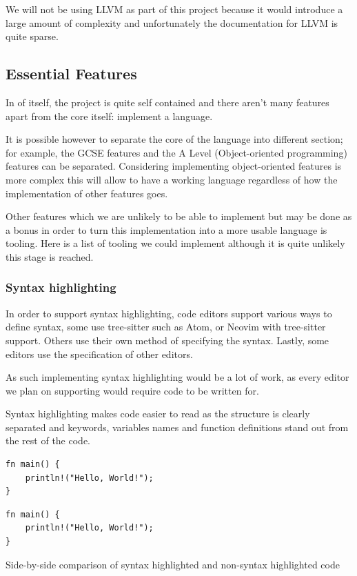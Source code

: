 \documentclass{article}
\begin{document}
We will not be using LLVM as part of this project because it would introduce a
large amount of complexity and unfortunately the documentation for LLVM is
quite sparse.

\subsection{Essential Features}

In of itself, the project is quite self contained and there aren't many
features apart from the core itself: implement a language.

It is possible however to separate the core of the language into different
section; for example, the GCSE features and the A Level (Object-oriented
programming) features can be separated. Considering implementing
object-oriented features is more complex this will allow to have a working
language regardless of how the implementation of other features goes.

Other features which we are unlikely to be able to implement but may be done as
a bonus in order to turn this implementation into a more usable language is
tooling. Here is a list of tooling we could implement although it is quite
unlikely this stage is reached.

\subsubsection{Syntax highlighting}

In order to support syntax highlighting, code editors support various ways to
define syntax, some use tree-sitter such as Atom, or Neovim with tree-sitter
support. Others use their own method of specifying the syntax. Lastly, some
editors use the specification of other editors.

As such implementing syntax highlighting would be a lot of work, as every
editor we plan on supporting would require code to be written for.

Syntax highlighting makes code easier to read as the structure is clearly
separated and keywords, variables names and function definitions stand out from
the rest of the code.

\begin{listing}
	\centering
	\begin{minipage}{.5\textwidth}
		\centering
		\begin{verbatim}
fn main() {
    println!("Hello, World!");
}
		\end{verbatim}
	\end{minipage}%
	\begin{minipage}{.5\textwidth}
		\centering
		\begin{verbatim}
fn main() {
    println!("Hello, World!");
}
		\end{verbatim}
	\end{minipage}

	\caption{Side-by-side comparison of syntax highlighted and non-syntax
	highlighted code}
\end{listing}
\end{document}
